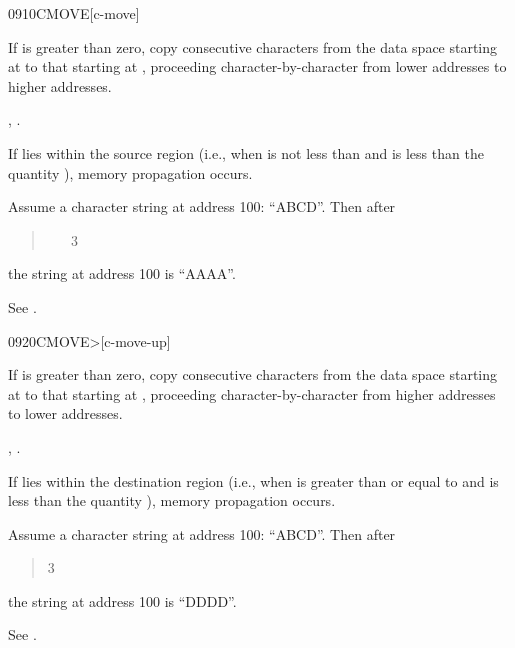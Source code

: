 \begin{worddef}{0910}{CMOVE}[c-move]
\item {}

	If  is greater than zero, copy  consecutive
	characters from the data space starting at  to
	that starting at , proceeding character-by-character
	from lower addresses to higher addresses.

\see {}, .

	\begin{rationale} %
		If  lies within the source region (i.e., when
		 is not less than  and
		 is less than the quantity 
		 \word[core]{+}), memory propagation occurs.

		Assume a character string at address
		100: ``ABCD''. Then after
		\begin{quote}  ~  ~ 3 
		\end{quote}
		the string at address 100 is ``AAAA''.

		See .
	\end{rationale}
\end{worddef}


\begin{worddef}[CMOVEtop]{0920}{CMOVE>}[c-move-up]
\item {}

	If  is greater than zero, copy  consecutive
	characters from the data space starting at  to
	that starting at , proceeding character-by-character
	from higher addresses to lower addresses.

\see {}, .

	\begin{rationale} %
		If  lies within the destination region (i.e.,
		when  is greater than or equal to
		 and  is less than the
		quantity  
		\word[core]{+}), memory propagation	occurs.

		Assume a character string at address
		100: ``ABCD''. Then after
		\begin{quote}   
			3 
		\end{quote}
		the string at address 100 is ``DDDD''.

		See .
	\end{rationale}
\end{worddef}


